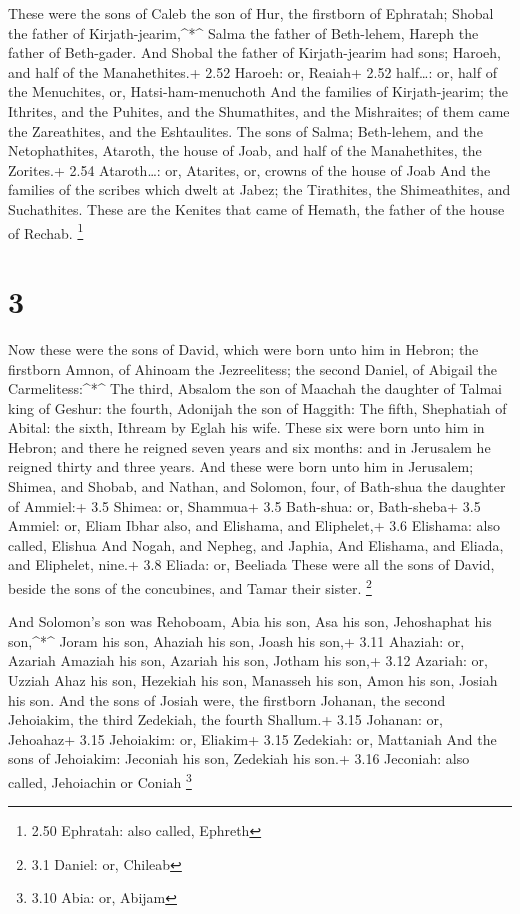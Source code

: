  These were the sons of Caleb the son of Hur, the firstborn
of Ephratah; Shobal the father of Kirjath-jearim,\^{}*\^{} 
Salma the father of Beth-lehem, Hareph the father of Beth-gader.
 And Shobal the father of Kirjath-jearim had sons; Haroeh,
and half of the Manahethites.+ 2.52 Haroeh: or, Reaiah+ 2.52 half\ldots:
or, half of the Menuchites, or, Hatsi-ham-menuchoth  And
the families of Kirjath-jearim; the Ithrites, and the Puhites, and the
Shumathites, and the Mishraites; of them came the Zareathites, and the
Eshtaulites.  The sons of Salma; Beth-lehem, and the
Netophathites, Ataroth, the house of Joab, and half of the Manahethites,
the Zorites.+ 2.54 Ataroth\ldots: or, Atarites, or, crowns of the house
of Joab  And the families of the scribes which dwelt at
Jabez; the Tirathites, the Shimeathites, and Suchathites. These are the
Kenites that came of Hemath, the father of the house of Rechab.
\footnote{2.50 Ephratah: also called, Ephreth}

\hypertarget{section-2}{%
\section{3}\label{section-2}}

 Now these were the sons of David, which were born unto him
in Hebron; the firstborn Amnon, of Ahinoam the Jezreelitess; the second
Daniel, of Abigail the Carmelitess:\^{}*\^{}  The third,
Absalom the son of Maachah the daughter of Talmai king of Geshur: the
fourth, Adonijah the son of Haggith:  The fifth, Shephatiah
of Abital: the sixth, Ithream by Eglah his wife.  These six
were born unto him in Hebron; and there he reigned seven years and six
months: and in Jerusalem he reigned thirty and three years. 
And these were born unto him in Jerusalem; Shimea, and Shobab, and
Nathan, and Solomon, four, of Bath-shua the daughter of Ammiel:+ 3.5
Shimea: or, Shammua+ 3.5 Bath-shua: or, Bath-sheba+ 3.5 Ammiel: or,
Eliam  Ibhar also, and Elishama, and Eliphelet,+ 3.6
Elishama: also called, Elishua  And Nogah, and Nepheg, and
Japhia,  And Elishama, and Eliada, and Eliphelet, nine.+ 3.8
Eliada: or, Beeliada  These were all the sons of David,
beside the sons of the concubines, and Tamar their sister. \footnote{3.1
  Daniel: or, Chileab}

 And Solomon's son was Rehoboam, Abia his son, Asa his son,
Jehoshaphat his son,\^{}*\^{}  Joram his son, Ahaziah his
son, Joash his son,+ 3.11 Ahaziah: or, Azariah  Amaziah his
son, Azariah his son, Jotham his son,+ 3.12 Azariah: or, Uzziah
 Ahaz his son, Hezekiah his son, Manasseh his son,
 Amon his son, Josiah his son.  And the sons
of Josiah were, the firstborn Johanan, the second Jehoiakim, the third
Zedekiah, the fourth Shallum.+ 3.15 Johanan: or, Jehoahaz+ 3.15
Jehoiakim: or, Eliakim+ 3.15 Zedekiah: or, Mattaniah  And
the sons of Jehoiakim: Jeconiah his son, Zedekiah his son.+ 3.16
Jeconiah: also called, Jehoiachin or Coniah \footnote{3.10 Abia: or,
  Abijam}

